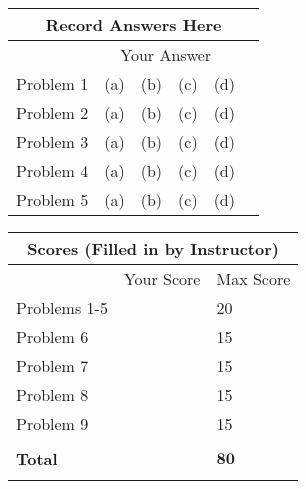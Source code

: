 \documentclass[letterpaper]{article}
\begin{document}
\newpage


\vspace*{1in}

\begin{center}
\Large
\begin{tabular}{|p{1.2in}|p{1.5in}|}
\hline
\multicolumn{2}{|c|}{\textbf{Record Answers Here}}\\
\hline
 & ~~Your Answer\\
\hline
Problem 1 &   (a)~~(b)~~(c)~~(d)~~\\
\hline
Problem 2 &   (a)~~(b)~~(c)~~(d)~~\\
\hline
Problem 3 &   (a)~~(b)~~(c)~~(d)~~\\
\hline
Problem 4 &   (a)~~(b)~~(c)~~(d)~~\\
\hline
Problem 5 &   (a)~~(b)~~(c)~~(d)~~\\
\hline
\end{tabular}
\end{center}

\vspace*{1in}

\begin{center}
\huge
\begin{tabular}{|p{2in}|p{1in}|p{1in}|}
\hline
\multicolumn{3}{|c|}{\textbf{Scores (Filled in by Instructor)}}\\
\hline
 & Your Score& Max Score \\
\hline
Problems 1-5 &  &   20\\
\hline
Problem 6 &  &   15\\
\hline
Problem 7 &  &   15\\
\hline
Problem 8 &  &   15\\
\hline
Problem 9 &  &   15\\
\hline
& & \\
\hline
\textbf{Total} &  &   $\mathbf{80}$\\
\hline
& & \\
\hline
%
\end{tabular}
\end{center}

\newpage

%
%
%
\end{document}

